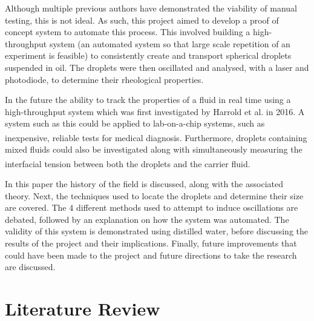 \documentclass{physics_article_B}
\begin{document}
    Although multiple previous authors have demonstrated the viability of manual testing, this is not ideal. As such, this project aimed to develop a proof of concept system to automate this process. This involved building a high-throughput system (an automated system so that large scale repetition of an experiment is feasible) to consistently create and transport spherical droplets suspended in oil. The droplets were then oscillated and analysed, with a laser and photodiode, to determine their rheological properties.
    
    In the future the ability to track the properties of a fluid in real time using a high-throughput system which was first investigated by Harrold et al. in 2016\cite{harrold}. A system such as this could be applied to lab-on-a-chip systems, such as inexpensive, reliable tests\textsuperscript{\cite{yager}} for medical diagnosis. Furthermore, droplets containing mixed fluids could also be investigated along with simultaneously measuring the interfacial tension between both the droplets and the carrier fluid\textsuperscript{\cite{Backholm2017}}.
    
    In this paper the history of the field is discussed, along with the associated theory. Next, the techniques used to locate the droplets and determine their size are covered. The 4 different methods used to attempt to induce oscillations are debated, followed by an explanation on how the system was automated. The validity of this system is demonstrated using distilled water, before discussing the results of the project and their implications. Finally, future improvements that could have been made to the project and future directions to take the research are discussed.

\section{Literature Review\label{sect:lit}}
\end{document}
